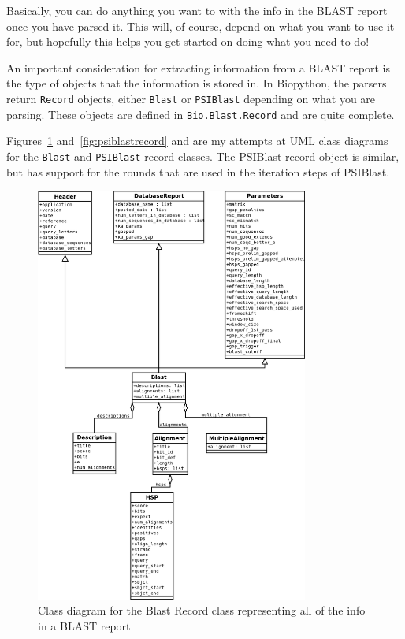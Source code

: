 Basically, you can do anything you want to with the info in the BLAST
report once you have parsed it. This will, of course, depend on what
you want to use it for, but hopefully this helps you get started on
doing what you need to do!

An important consideration for extracting information from a BLAST report is the type of objects that the information is stored in. In Biopython, the parsers return \verb|Record| objects, either \verb|Blast| or \verb|PSIBlast| depending on what you are parsing. These objects are defined in \verb|Bio.Blast.Record| and are quite complete.


Figures~\ref{fig:blastrecord} and~\ref{fig:psiblastrecord} and are my attempts at UML class diagrams for the \verb|Blast| and \verb|PSIBlast| record classes.
The PSIBlast record object is similar, but has support for the rounds that are used in the iteration steps of PSIBlast.

\begin{figure}[htbp]
\centering
\includegraphics[width=0.8\textwidth]{images/BlastRecord.png}
\caption{Class diagram for the Blast Record class representing all of the info in a BLAST report}
\label{fig:blastrecord}
\end{figure}

